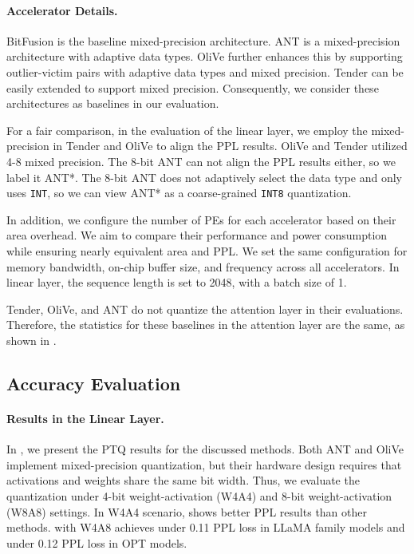 \paragraph{Accelerator Details. }
BitFusion is the baseline mixed-precision architecture.
ANT is a mixed-precision architecture with adaptive data types.
OliVe further enhances this by supporting outlier-victim pairs with adaptive data types and mixed precision.
Tender can be easily extended to support mixed precision.
Consequently, we consider these architectures as baselines in our evaluation.


For a fair comparison, in the evaluation of the linear layer, we employ the mixed-precision in Tender and OliVe to align the PPL results.
OliVe and Tender utilized 4-8 mixed precision.
The 8-bit ANT can not align the PPL results either, so we label it ANT*.
The 8-bit ANT does not adaptively select the data type and only uses \texttt{INT}, so we can view ANT* as a coarse-grained \texttt{INT8} quantization.

In addition, we configure the number of PEs for each accelerator based on their area overhead.
We aim to compare their performance and power consumption while ensuring nearly equivalent area and PPL.
We set the same configuration for memory bandwidth, on-chip buffer size, and frequency across all accelerators.
In linear layer, the sequence length is set to 2048, with a batch size of 1.



Tender, OliVe, and ANT do not quantize the attention layer in their evaluations.
Therefore, the statistics for these baselines in the attention layer are the same, as shown in .



\subsection{Accuracy Evaluation}
\label{sec:accuracy}


\paragraph{Results in the Linear Layer. }
In , we present the PTQ results for the discussed methods.
Both ANT and OliVe implement mixed-precision quantization, but their hardware design requires that activations and weights share the same bit width.
Thus, we evaluate the quantization under 4-bit weight-activation (W4A4) and 8-bit weight-activation (W8A8) settings.
In W4A4 scenario, \proj shows better PPL results than other methods.
\proj with W4A8 achieves under 0.11 PPL loss in LLaMA family models and under 0.12 PPL loss in OPT models.

